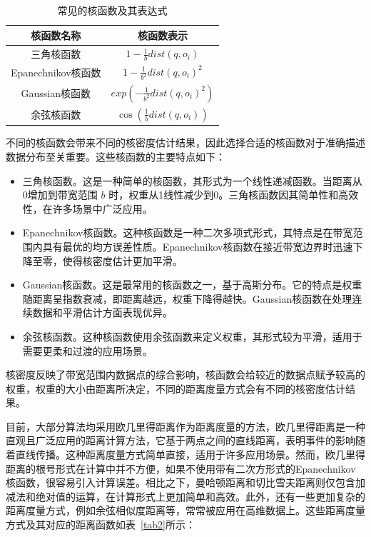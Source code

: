 \begin{table}[!h]
	\centering
	\def\arraystretch{1.5}
	\caption{常见的核函数及其表达式}
	\label{tab1}
	\begin{tabular}{c|c}
		\hline
		核函数名称       & 核函数表示                                             \\ \hline \hline
		三角核函数 \cite{fleuret_scale-invariance_2003, gong_estimating_2014}   & $1-\frac{1}{b}dist(q,o_i)$         \\ 
		Epanechnikov核函数 \cite{samiuddin_nonparametric_1990, bil_identification_2013} & $1-\frac{1}{b^2}dist(q,o_i)^2$     \\ 
		Gaussian核函数 \cite{scholkopf_comparing_1997, kristan_multivariate_2011}     & $exp(-\frac{1}{b^2}dist(q,o_i)^2)$ \\ 
		余弦核函数 \cite{de_felice_short-term_2015}       & $\cos(\frac{1}{b}dist(q,o_i))$     \\ \hline
	\end{tabular}
\end{table}

不同的核函数会带来不同的核密度估计结果，因此选择合适的核函数对于准确描述数据分布至关重要。这些核函数的主要特点如下：
\begin{itemize}
	\item 三角核函数。这是一种简单的核函数，其形式为一个线性递减函数。当距离从0增加到带宽范围 $b$ 时，权重从1线性减少到0。三角核函数因其简单性和高效性，在许多场景中广泛应用。
	\item Epanechnikov核函数。这种核函数是一种二次多项式形式，其特点是在带宽范围内具有最优的均方误差性质。Epanechnikov核函数在接近带宽边界时迅速下降至零，使得核密度估计更加平滑。
	\item Gaussian核函数。这是最常用的核函数之一，基于高斯分布。它的特点是权重随距离呈指数衰减，即距离越远，权重下降得越快。Gaussian核函数在处理连续数据和平滑估计方面表现优异。
	\item 余弦核函数。这种核函数使用余弦函数来定义权重，其形式较为平滑，适用于需要更柔和过渡的应用场景。
\end{itemize}

核密度反映了带宽范围内数据点的综合影响，核函数会给较近的数据点赋予较高的权重，权重的大小由距离所决定，不同的距离度量方式会有不同的核密度估计结果。

目前，大部分算法均采用欧几里得距离作为距离度量的方法，欧几里得距离是一种直观且广泛应用的距离计算方法，它基于两点之间的直线距离，表明事件的影响随着直线传播。这种距离度量方式简单直接，适用于许多应用场景。然而，欧几里得距离的根号形式在计算中并不方便，如果不使用带有二次方形式的Epanechnikov核函数，很容易引入计算误差。相比之下，曼哈顿距离和切比雪夫距离则仅包含加减法和绝对值的运算，在计算形式上更加简单和高效。此外，还有一些更加复杂的距离度量方式，例如余弦相似度距离等，常常被应用在高维数据上。这些距离度量方式及其对应的距离函数如表~\ref{tab2}所示：

